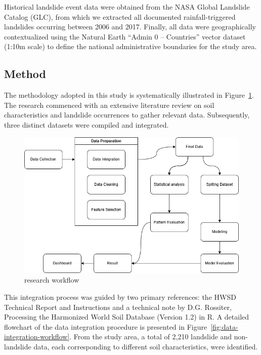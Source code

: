 Historical landslide event data were obtained from the NASA Global Landslide Catalog (GLC), from which we extracted all documented rainfall-triggered landslides occurring between 2006 and 2017. Finally, all data were geographically contextualized using the Natural Earth “Admin 0 – Countries” vector dataset (1:10m scale) to define the national administrative boundaries for the study area.


\subsection{Method}
The methodology adopted in this study is systematically illustrated in Figure~\ref{fig:research-workflow}. The research commenced with an extensive literature review on soil characteristics and landslide occurrences to gather relevant data. Subsequently, three distinct datasets were compiled and integrated.

\begin{figure}[htbp]
    \centerline{\includegraphics[width=\linewidth]{fig2.png}}
    \caption{research workflow}
    \label{fig:research-workflow}
\end{figure}
This integration process was guided by two primary references: the HWSD Technical Report and Instructions and a technical note by D.G. Rossiter, Processing the Harmonized World Soil Database (Version 1.2) in R. A detailed flowchart of the data integration procedure is presented in Figure~\ref{fig:data-integration-workflow}. From the study area, a total of 2,210 landslide and non-landslide data, each corresponding to different soil characteristics, were identified.

